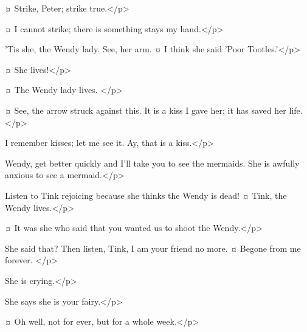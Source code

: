 \tootlesspeaks {}¤
Strike, Peter; strike true.</p>

\peterspeaks {}¤
I cannot strike; there is something stays my hand.</p>


\nibsspeaks
'Tis she, the Wendy lady.
See, her arm.
¤
I think she said 'Poor Tootles.'</p>

\peterspeaks {}¤
She lives!</p>

\slightlyspeaks {}¤
The Wendy lady lives.
</p>

\peterspeaks {}¤
See, the arrow struck against this.
It is a kiss I gave her; it has saved her life.</p>

\slightlyspeaks
I remember kisses; let me see it.
Ay, that is a kiss.</p>

\peterspeaks
Wendy, get better quickly and I'll take you to see the mermaids.
She is awfully anxious to see a mermaid.</p>


\curlyspeaks
Listen to Tink rejoicing because she thinks the Wendy is dead!
¤
Tink, the Wendy lives.</p>


\secondtwinspeaks {}¤
It was she who said that you wanted us to shoot the Wendy.</p>

\peterspeaks
She said that?
Then listen, Tink, I am your friend no more.
¤
Begone from me forever.
</p>

\curlyspeaks
She is crying.</p>

\tootlesspeaks
She says she is your fairy.</p>

\peterspeaks {}¤
Oh well, not for ever, but for a whole week.</p>

